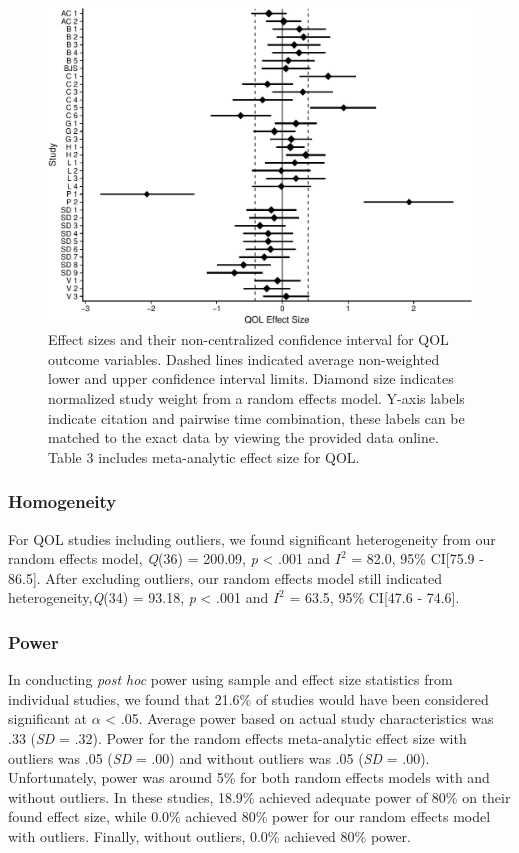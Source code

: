 \documentclass[man, mask]{apa6}
\theoremstyle{definition}
\theoremstyle{definition}
\theoremstyle{definition}
\theoremstyle{remark}
\begin{document}
\begin{figure}[htbp]
\centering
\includegraphics{meta_markdown_files/figure-latex/qolpic-1.pdf}
\caption{\label{fig:qolpic}Effect sizes and their non-centralized confidence
interval for QOL outcome variables. Dashed lines indicated average
non-weighted lower and upper confidence interval limits. Diamond size
indicates normalized study weight from a random effects model. Y-axis
labels indicate citation and pairwise time combination, these labels can
be matched to the exact data by viewing the provided data online. Table
3 includes meta-analytic effect size for QOL.}
\end{figure}

\subsubsection{Homogeneity}\label{homogeneity-2}

For QOL studies including outliers, we found significant heterogeneity
from our random effects model, \emph{Q}(36) = 200.09, \emph{p}
\textless{} .001 and \(I^2\) = 82.0, 95\% CI{[}75.9 - 86.5{]}. After
excluding outliers, our random effects model still indicated
heterogeneity,\emph{Q}(34) = 93.18, \emph{p} \textless{} .001 and
\(I^2\) = 63.5, 95\% CI{[}47.6 - 74.6{]}.

\subsubsection{Power}\label{power-2}

In conducting \emph{post hoc} power using sample and effect size
statistics from individual studies, we found that 21.6\% of studies
would have been considered significant at \(\alpha\) \textless{} .05.
Average power based on actual study characteristics was .33 (\emph{SD} =
.32). Power for the random effects meta-analytic effect size with
outliers was .05 (\emph{SD} = .00) and without outliers was .05
(\emph{SD} = .00). Unfortunately, power was around 5\% for both random
effects models with and without outliers. In these studies, 18.9\%
achieved adequate power of 80\% on their found effect size, while 0.0\%
achieved 80\% power for our random effects model with outliers. Finally,
without outliers, 0.0\% achieved 80\% power.
\end{document}
